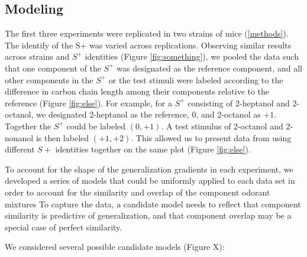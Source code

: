 \subsection{Modeling}

The first three experiments were replicated in two strains of mice (\ref{methods}). The identify of the S+ was varied across replications.  Observing similar results across strains and $S^+$ identities (Figure \ref{fig:something}), we pooled the data such that one component of the $S^+$ was designated as the reference component, and all other components in the $S^+$ or the test stimuli were labeled according to the difference in carbon chain length among their components relative to the reference (Figure \ref{fig:else}).  For example, for a $S^+$ consisting of 2-heptanol and 2-octanol, we designated 2-heptanol as the reference, $0$, and 2-octanol as $+1$.  Together the $S^+$ could be labeled $(0,+1)$.  A test stimulus of 2-octanol and 2-nonanol is then labeled $(+1,+2)$.  This allowed us to present data from using different $S+$ identities together on the same plot (Figure \ref{fig:else}).  

To account for the shape of the generalization gradients in each experiment, we developed a series of models that could be uniformly applied to each data set in order to account for  the similarity and overlap of the component odorant mixtures  To capture the data, a candidate model needs to reflect that component similarity is predictive of generalization, and that component overlap may be a special case of perfect similarity.  

We considered several possible candidate models (Figure X):